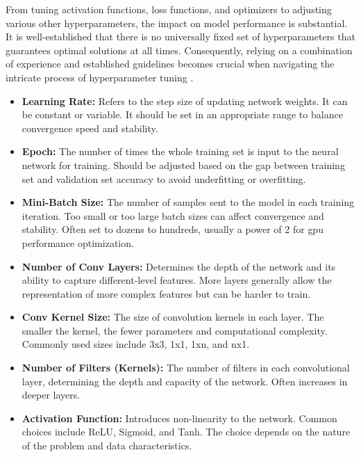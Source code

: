 From tuning activation functions, loss functions, and optimizers to adjusting various other hyperparameters, the impact on model performance is substantial. It is well-established that there is no universally fixed set of hyperparameters that guarantees optimal solutions at all times. Consequently, relying on a combination of experience and established guidelines becomes crucial when navigating the intricate process of hyperparameter tuning \cite{Li:2021}.

\begin{itemize}
	\item \textbf{Learning Rate:} Refers to the step size of updating network weights. It can be constant or variable. It should be set in an appropriate range to balance convergence speed and stability.
	
	\item \textbf{Epoch:} The number of times the whole training set is input to the neural network for training. Should be adjusted based on the gap between training set and validation set accuracy to avoid underfitting or overfitting.
	
	\item \textbf{Mini-Batch Size:} The number of samples sent to the model in each training iteration. Too small or too large batch sizes can affect convergence and stability. Often set to dozens to hundreds, usually a power of 2 for \ac{gpu} performance optimization.
	
	\item \textbf{Number of Conv Layers:} Determines the depth of the network and its ability to capture different-level features. More layers generally allow the representation of more complex features but can be harder to train.
	
	\item \textbf{Conv Kernel Size:} The size of convolution kernels in each layer. The smaller the kernel, the fewer parameters and computational complexity. Commonly used sizes include 3x3, 1x1, 1xn, and nx1.
	
	\item \textbf{Number of Filters (Kernels):} The number of filters in each convolutional layer, determining the depth and capacity of the network. Often increases in deeper layers.
	
	\item \textbf{Activation Function:} Introduces non-linearity to the network. Common choices include ReLU, Sigmoid, and Tanh. The choice depends on the nature of the problem and data characteristics.
\end{itemize}


